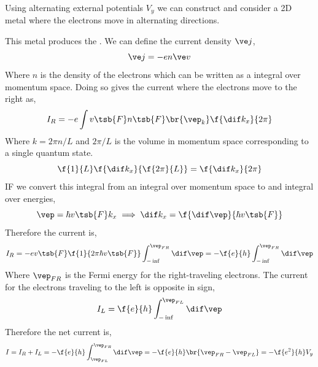 \documentclass{article}
\begin{document}
Using alternating external potentials $V_y$ we can construct and consider a 2D metal where the electrons move in alternating directions.
\begin{center}
\end{center}
This metal produces the . We can define the current density $\ve j$,
\[ \ve j = - e n \ve v \]
Where $n$ is the density of the electrons which can be written as a integral over momentum space.
Doing so gives the current where the electrons move to the right as,
\[ I_R = - e \int v\tsb{F} n\tsb{F}\br{\vep_k} \f{\dif k_x}{2 \pi} \]
Where $k = 2\pi n / L$ and $2\pi / L$ is the volume in momentum space corresponding to a single quantum state.
\[ \f{1}{L} \f{\dif k_x}{\f{2 \pi }{L}} = \f{\dif k_x}{2 \pi} \]
IF we convert this integral from an integral over momentum space to and integral over energies,
\[ \vep = \hbar v\tsb{F} k_x \implies \dif k_x = \f{\dif \vep}{\hbar v\tsb{F}} \]
Therefore the current is,
\[ I_{R} = - e v\tsb{F}  \f{1}{2\pi \hbar v\tsb{F}} \int_{-\inf}^{\vep_{FR}} \dif \vep = - \f{e}{h} \int_{-\inf}^{\vep_{FR}} \dif \vep \]
Where $\vep_{FR}$ is the Fermi energy for the right-traveling electrons.
The current for the electrons traveling to the left is opposite in sign,
\[ I_L = \f{e}{h} \int_{-\inf}^{\vep_{FL}} \dif \vep \]
Therefore the net current is,
\[ I = I_{R} + I_{L} = - \f{e}{h} \int_{\vep_{FL}}^{\vep_{FR}} \dif \vep = - \f{e}{h} \br{\vep_{FR} - \vep_{FL}} = - \f{e^2}{h} V_{y} \]
\end{document}
